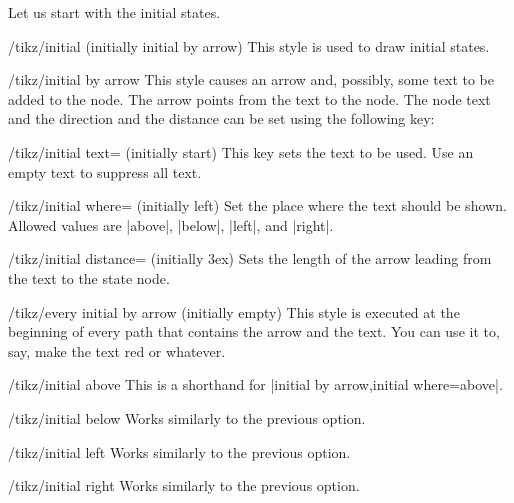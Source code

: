 Let us start with the initial states.
\begin{stylekey}{/tikz/initial (initially initial by arrow)}
  This style is used to draw initial states.
\end{stylekey}
\begin{stylekey}{/tikz/initial by arrow}
  This style causes an arrow and, possibly, some text to be added to
  the node. The arrow points from the text to the node. The node text
  and the direction and the distance can be set using the following
  key:
  \begin{key}{/tikz/initial text= (initially start)}
    This key sets the text to be used. Use an empty text to suppress
    all text.
  \end{key}
  \begin{key}{/tikz/initial where= (initially left)}
    Set the place where the text should be shown. Allowed values are
    |above|, |below|, |left|, and |right|.
  \end{key}
  \begin{key}{/tikz/initial distance= (initially 3ex)}
    Sets the length of the arrow leading from the text to the state
    node.
  \end{key}
  \begin{stylekey}{/tikz/every initial by arrow (initially \normalfont empty)}
    This style is executed at the beginning of every path that contains
    the arrow and the text. You can use it to, say, make the text red or
    whatever.
  \end{stylekey}
\begin{codeexample}[]
\end{codeexample}
\end{stylekey}
\begin{stylekey}{/tikz/initial above}
  This is a shorthand for |initial by arrow,initial where=above|.
\end{stylekey}
\begin{stylekey}{/tikz/initial below}
  Works similarly to the previous option.
\end{stylekey}
\begin{stylekey}{/tikz/initial left}
  Works similarly to the previous option.
\end{stylekey}
\begin{stylekey}{/tikz/initial right}
  Works similarly to the previous option.
\end{stylekey}

